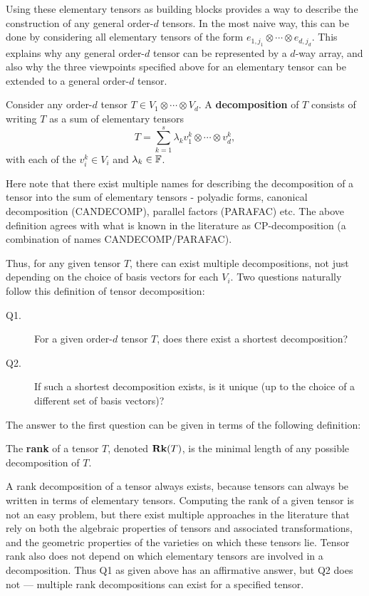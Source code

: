 \documentclass[../Lael_John_MasterThesis_Draft.tex]{subfiles}
\begin{document}
Using these elementary tensors as building blocks provides a way to describe the construction of any general order-$d$ tensors. In the most naive way, this can be done by considering all elementary tensors of the form $e_{1, j_1} \otimes \cdots \otimes e_{d, j_d}$. This explains why any general order-$d$ tensor can be represented by a $d$-way array, and also why the three viewpoints specified above for an elementary tensor can be extended to a general order-$d$ tensor.
\begin{definition}\label{defn:decomposition}
    Consider any order-$d$ tensor $T \in V_1 \otimes \cdots \otimes V_d$. A \textbf{decomposition} of $T$ consists of writing $T$ as a sum of elementary tensors $$T = \sum_{k=1}^{s} \lambda_k v_1^k \otimes \cdots \otimes v_d^k,$$ with each of the $v_i^k \in V_i$ and $\lambda_k \in \mathbb{F}$.
\end{definition}
\begin{remark}
    Here note that there exist multiple names for describing the decomposition of a tensor into the sum of elementary tensors - polyadic forms, canonical decomposition (CANDECOMP), parallel factors (PARAFAC) etc. The above definition agrees with what is known in the literature as CP-decomposition (a combination of names CANDECOMP/PARAFAC). \cite{kolda_tensor_2009}
\end{remark}
Thus, for any given tensor $T$, there can exist multiple decompositions, not just depending on the choice of basis vectors for each $V_i$. Two questions naturally follow this definition of tensor decomposition: \begin{description}
    \item[Q1.] For a given order-$d$ tensor $T$, does there exist a shortest decomposition?
    \item[Q2. ] If such a shortest decomposition exists, is it unique (up to the choice of a different set of basis vectors)?
\end{description}
The answer to the first question can be given in terms of the following definition:
\begin{definition}\label{defn:tensorrank}
    The \textbf{rank} of a tensor $T$, denoted $\textbf{Rk}(T)$, is the minimal length of any possible decomposition of $T$.
\end{definition}
A rank decomposition of a tensor always exists, because tensors can always be written in terms of elementary tensors. Computing the rank of a given tensor is not an easy problem, but there exist multiple approaches in the literature that rely on both the algebraic properties of tensors and associated transformations, and the geometric properties of the varieties on which these tensors lie. Tensor rank also does not depend on which elementary tensors are involved in a decomposition. Thus Q1 as given above has an affirmative answer, but Q2 does not --- multiple rank decompositions can exist for a specified tensor.
\end{document}
